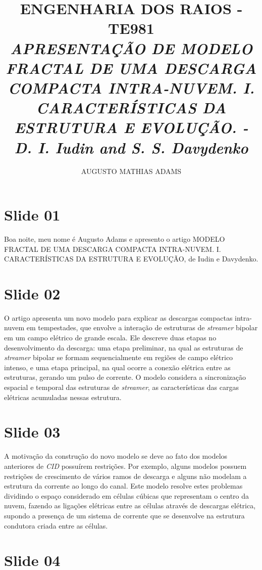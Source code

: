 \documentclass[a4paper, 12pt, onecolumn,singlespacing]{article}
\title{\normalsize{ENGENHARIA DOS RAIOS - TE981}\\ \huge{\textbf\textit{{APRESENTAÇÃO DE MODELO FRACTAL DE UMA DESCARGA COMPACTA INTRA-NUVEM. I. CARACTERÍSTICAS DA ESTRUTURA E EVOLUÇÃO. - D. I. Iudin and S. S. Davydenko}}\\}}
\author{\small{AUGUSTO MATHIAS ADAMS}}
\begin{document}
	
	\maketitle
	
	\section{Slide 01}
	
		Boa noite, meu nome é Augusto Adams e apresento o artigo MODELO FRACTAL DE UMA DESCARGA COMPACTA INTRA-NUVEM. I. CARACTERÍSTICAS DA ESTRUTURA E EVOLUÇÃO, de Iudin e Davydenko.
	
	\section{Slide 02}
	
		O artigo apresenta um novo modelo para explicar as descargas compactas intra-nuvem em tempestades, que envolve a interação de estruturas de \textit{streamer} bipolar em um campo elétrico de grande escala. Ele descreve duas etapas no desenvolvimento da descarga: uma etapa preliminar, na qual as estruturas de \textit{streamer} bipolar se formam sequencialmente em regiões de campo elétrico intenso, e uma etapa principal, na qual ocorre a conexão elétrica entre as estruturas, gerando um pulso de corrente. O modelo considera a sincronização espacial e temporal das estruturas de \textit{streamer}, as características das cargas elétricas acumuladas nessas estrutura.
	
	\section{Slide 03}
	
		A motivação da construção do novo modelo se deve ao fato dos modelos anteriores de \textit{CID} possuírem restrições. Por exemplo, alguns modelos possuem restrições de crescimento de vários ramos de descarga e alguns não modelam a estrutura da corrente ao longo do canal. Este modelo resolve estes problemas dividindo o espaço considerado em células cúbicas que representam o centro da nuvem, fazendo as ligações elétricas entre as células através de descargas elétrica, supondo a presença de um sistema de corrente que	se desenvolve na estrutura condutora criada entre as células.
		
	\section{Slide 04}
	
\end{document}
